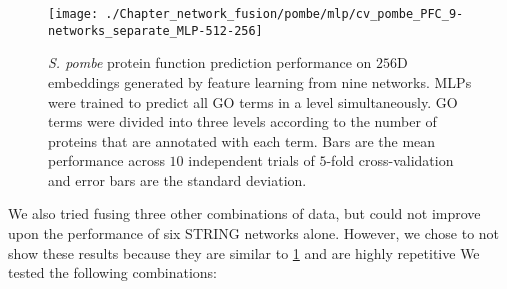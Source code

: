 \begin{figure}[!hbt]
    \centering
    \texttt{[image: ./Chapter\_network\_fusion/pombe/mlp/cv\_pombe\_PFC\_9-networks\_separate\_MLP-512-256]}
    \caption{%
        \emph{S. pombe} protein function prediction performance on $256$D embeddings generated by feature learning from nine networks.
        MLPs were trained to predict all GO terms in a level simultaneously.
        GO terms were divided into three levels according to the number of proteins that are annotated with each term.
        Bars are the mean performance across $10$ independent trials of $5$-fold cross-validation and error bars are the standard deviation.
    }
    \label{fig:pombe-9-networks-cv}
\end{figure}


We also tried fusing three other combinations of data, but could not improve upon the performance of six STRING networks alone.
However, we chose to not show these results because they are similar to \ref{fig:pombe-9-networks-cv} and are highly repetitive
We tested the following combinations:

